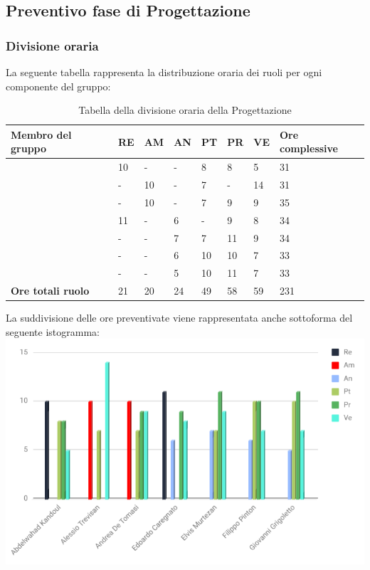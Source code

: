 \subsection{Preventivo fase di Progettazione}

\subsubsection{Divisione oraria}
La seguente tabella rappresenta la distribuzione oraria dei ruoli per ogni componente del gruppo:
\renewcommand{\arraystretch}{2}
\begin{longtable}[h!] { C{3.5cm} C{1cm} C{1cm} C{1cm} C{1cm} C{1cm} C{1cm} C{2cm}}
\caption{Tabella della divisione oraria della Progettazione}\\
\rowcolor{\primaryColor}

\textcolor{\secondaryColor}{\textbf{Membro del gruppo}} & 
\textcolor{\secondaryColor}{\textbf{RE}} & 
\textcolor{\secondaryColor}{\textbf{AM}} & 
\textcolor{\secondaryColor}{\textbf{AN}} & 
\textcolor{\secondaryColor}{\textbf{PT}} & 
\textcolor{\secondaryColor}{\textbf{PR}} & 
\textcolor{\secondaryColor}{\textbf{VE}} & 
\textcolor{\secondaryColor}{\textbf{Ore complessive}}\\	
\endhead
        
\AW{}                     & 10  & - & - & 8 & 8 & 5 & 31 \\
\AT{}                     & -  & 10 & - & 7 & - & 14 & 31 \\
\AD{}                     & -  & 10 & - & 7 & 9 & 9 & 35 \\
\EC{}                     & 11  & - & 6 & - & 9 & 8 & 34 \\
\EM{}                     & -  & - & 7 & 7 & 11 & 9 & 34 \\
\FP{}                     & -  & - & 6 & 10 & 10 & 7 & 33 \\
\GG{}                     & -  & - & 5 & 10 & 11 & 7 & 33 \\
\textbf{Ore totali ruolo} & 21 & 20 & 24 & 49 & 58 & 59 & 231 \\

		
\end{longtable}
La suddivisione delle ore preventivate viene rappresentata anche sottoforma del seguente istogramma:\\
\includegraphics[width=1\textwidth]{./src/Preventivo/src/img/IstoProj.png}
